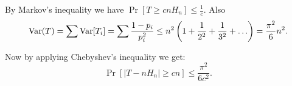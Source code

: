 By Markov's inequality we have $\Pr[T \geq c n H_n] \leq \frac{1}{c}$. Also $$\mathrm{Var}(T) = \sum \mathrm{Var}[T_i] = \sum \frac{1 - p_i}{p_i^2} \leq n^2 \left( 1 + \frac{1}{2^2} + \frac{1}{3^2} + \ldots \right) = \frac{\pi^2}{6}  n^2.$$

Now by applying Chebyshev's inequality we get:
$$\Pr[\vert T - n H_n\vert \geq c n] \leq \frac{\pi^2}{6c^2}.$$

